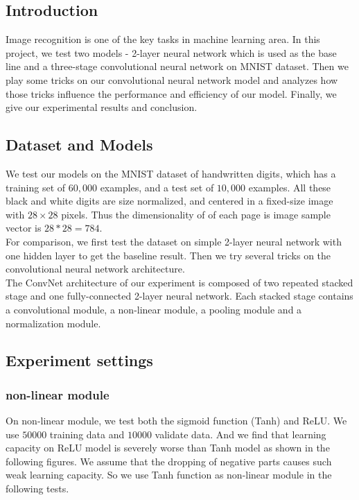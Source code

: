 \documentclass[paper=a4, fontsize=11pt]{scrartcl} %
\numberwithin{equation}{section} %
\numberwithin{figure}{section} %
\numberwithin{table}{section} %
\begin{document}
\subsection{\textbf{Introduction}}
Image recognition is one of the key tasks in machine learning area. In this project, we test two models - 2-layer neural network  which is used as the base line and a three-stage convolutional neural network on MNIST dataset. Then we play some tricks on our convolutional neural network model and analyzes how those tricks influence the performance and efficiency of our model. Finally, we give our experimental results and conclusion.
\subsection{\textbf{Dataset and Models}}
We test our models on the MNIST dataset of handwritten digits, which has a training set of $60,000$ examples, and a test set of $10,000$ examples. All these black and white digits are size normalized, and centered in a fixed-size image with $28 \times 28$ pixels. Thus the dimensionality of of each page is image sample vector is $28 * 28 = 784$.  \\

For comparison, we first test the dataset on simple 2-layer neural network with one hidden layer to get the baseline result. Then we try several tricks on the convolutional neural network architecture. \\

The  ConvNet  architecture of our experiment is composed of two repeated stacked stage and one fully-connected 2-layer neural network. Each stacked stage contains a convolutional module, a non-linear module, a pooling module and a normalization module. 
\subsection{\textbf{Experiment settings}}

\subsubsection{\textbf{non-linear module}}
On non-linear module, we test both the sigmoid function (Tanh) and ReLU. We use $50000$ training data and $10000$ validate data. And we find that learning capacity on ReLU model is severely worse than Tanh model as shown in the following figures. We assume that the dropping of negative parts causes such weak learning capacity. So we use Tanh function as non-linear module in the following tests.
\end{document}
